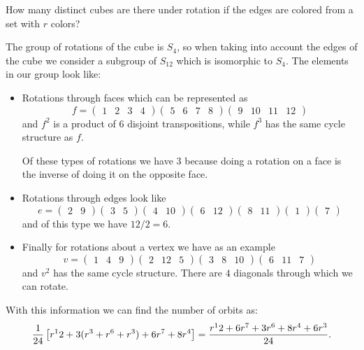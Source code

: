 \documentclass[12pt]{memoir}
\begin{document}
\begin{Ej}[6.9 Sagan]
    How many distinct cubes are there under rotation if the edges are colored from a set with $r$ colors? 
\end{Ej}
\begin{ptcbr}
    The group of rotations of the cube is $S_4$, so when taking into account the edges of the cube we consider a subgroup of $S_{12}$ which is isomorphic to $S_4$. The elements in our group look like:
    \begin{itemize}
        \itemsep=-0.4em
        \item Rotations through faces which can be represented as 
        $$f=\begin{pmatrix}1&2&3&4\end{pmatrix}\begin{pmatrix}5&6&7&8\end{pmatrix}\begin{pmatrix}9&10&11&12\end{pmatrix}$$
        and $f^2$ is a product of $6$ disjoint transpositions, while $f^3$ has the same cycle structure as $f$.\par 
        Of these types of rotations we have $3$ because doing a rotation on a face is the inverse of doing it on the opposite face.
        \item Rotations through edges look like 
        $$e=\begin{pmatrix}2&9\end{pmatrix}\begin{pmatrix}3&5\end{pmatrix}\begin{pmatrix}4&10\end{pmatrix}\begin{pmatrix}6&12\end{pmatrix}\begin{pmatrix}8&11\end{pmatrix}\begin{pmatrix}1\end{pmatrix}\begin{pmatrix}7\end{pmatrix}$$
        and of this type we have $12/2=6$.
        \item Finally for rotations about a vertex we have as an example 
        $$v=\begin{pmatrix}1&4&9\end{pmatrix}\begin{pmatrix}2&12&5\end{pmatrix}\begin{pmatrix}3&8&10\end{pmatrix}\begin{pmatrix}6&11&7\end{pmatrix}$$
        and $v^2$ has the same cycle structure. There are $4$ diagonals through which we can rotate.
    \end{itemize}
With this information we can find the number of orbits as:
$$\frac{1}{24}\left\lbrack r^12+3(r^3+r^6+r^3)+6r^7+8r^4\right\rbrack=\frac{r^12+6r^7+3r^6+8r^4+6r^3}{24}.$$
\end{ptcbr}
\end{document}

